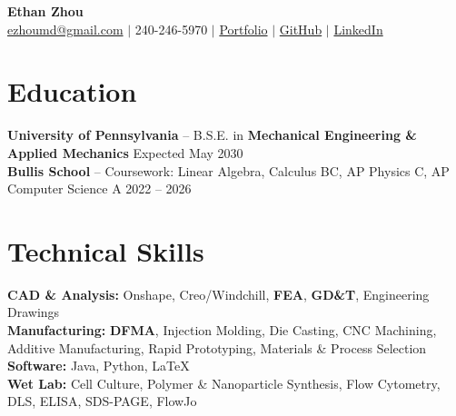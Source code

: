 \documentclass[10pt, letterpaper]{article}
\begin{document}
\begin{center}
    {\sffamily\LARGE\bfseries Ethan Zhou}
    \vspace{2pt} \\
    \href{mailto:ezhoumd@gmail.com}{ezhoumd@gmail.com}
    $|$
    240-246-5970
    $|$
    \href{https://ezhoumd.github.io/personal-portfolio/}{Portfolio}
    $|$
    \href{https://github.com/ezhoumd}{GitHub}
    $|$
    \href{https://www.linkedin.com/in/ezhoumd/}{LinkedIn}
\end{center}

\section{Education}
    \textbf{University of Pennsylvania} -- B.S.E. in \textbf{Mechanical Engineering \& Applied Mechanics}
    \hfill Expected May 2030 \\
    \textbf{Bullis School} -- Coursework: Linear Algebra, Calculus BC, AP Physics C, AP Computer Science A
    \hfill 2022 -- 2026

\section{Technical Skills}
    \textbf{CAD \& Analysis:} Onshape, Creo/Windchill, \textbf{FEA}, \textbf{GD\&T}, Engineering Drawings \\
    \textbf{Manufacturing:} \textbf{DFMA}, Injection Molding, Die Casting, CNC Machining, Additive Manufacturing, Rapid Prototyping, Materials \& Process Selection \\
    \textbf{Software:} Java, Python, LaTeX \\
    \textbf{Wet Lab:} Cell Culture, Polymer \& Nanoparticle Synthesis, Flow Cytometry, DLS, ELISA, SDS-PAGE, FlowJo
\end{document}
